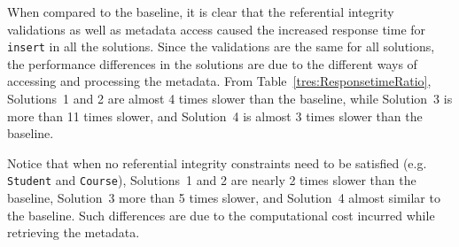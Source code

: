 When compared to the baseline,  it is clear that the referential integrity
validations as well as metadata access caused the increased response time for
\texttt{insert} in all the solutions.  Since the validations are the same for
all solutions,  the performance differences in the solutions are due to the
different ways of accessing and processing the metadata.  From
Table~\ref{tres:ResponsetimeRatio}, Solutions~1 and 2  are almost 4 times slower
than the baseline, while Solution~3 is more than 11 times slower, and 
Solution~4 is almost 3 times slower than the baseline.

Notice that when no referential integrity constraints need to be satisfied (e.g.
\texttt{Student} and \texttt{Course}), Solutions~1 and 2 are nearly 2 times
slower than the baseline,  Solution~3   more than 5 times slower, and  
Solution~4  almost similar to the baseline. Such differences are due to the
computational cost incurred while retrieving the metadata. 

